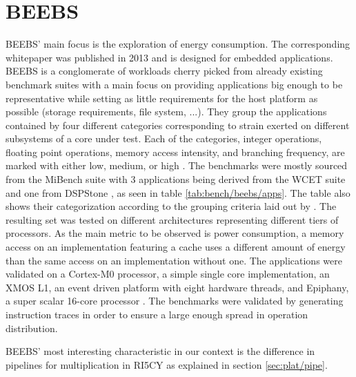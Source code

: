 \documentclass[../bachelor_paper.tex]{subfiles}
\begin{document}
\section{BEEBS}
BEEBS' main focus is the exploration of energy consumption. The corresponding whitepaper was published in 2013 and is designed for embedded applications. BEEBS is a conglomerate of workloads cherry picked from already existing benchmark suites with a main focus on providing applications big enough to be representative while setting as little requirements for the host platform as possible (storage requirements, file system, ...). They group the applications contained by four different categories corresponding to strain exerted on different subsystems of a core under test. Each of the categories, integer operations, floating point operations, memory access intensity, and branching frequency, are marked with either low, medium, or high \cite{pallisterBEEBSOpenBenchmarks2013}. The benchmarks were mostly sourced from the MiBench suite \cite{guthausMiBenchFreeCommercially2001} with 3 applications being derived from the WCET suite \cite{gustafssonMalardalenWCETBenchmarks2010} and one from DSPStone \cite{zivojnovicDSPstoneDSPorientedBenchmarking1994}, as seen in table \ref{tab:bench/beebs/apps}. The table also shows their categorization according to the grouping criteria laid out by \cite{pallisterBEEBSOpenBenchmarks2013}. The resulting set was tested on different architectures representing different tiers of processors. As the main metric to be observed is power consumption, a memory access on an implementation featuring a cache uses a different amount of energy than the same access on an implementation without one. The applications were validated on a Cortex-M0 processor, a simple single core implementation, an XMOS L1, an event driven platform with eight hardware threads, and Epiphany, a super scalar 16-core processor \cite{pallisterBEEBSOpenBenchmarks2013}. The benchmarks were validated by generating instruction traces in order to ensure a large enough spread in operation distribution.

BEEBS' most interesting characteristic in our context is the difference in pipelines for multiplication in RI5CY as explained in section \ref{sec:plat/pipe}. 
\end{document}
